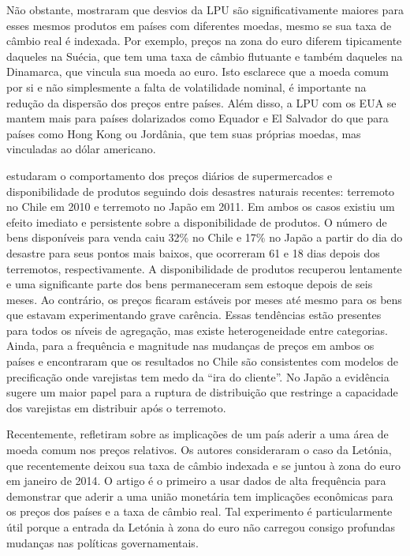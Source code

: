 \documentclass[twoside,a4paper,12pt]{report}
\begin{document}
Não obstante, \citet{cavallo2012currency} mostraram que desvios da LPU são significativamente maiores para esses mesmos produtos em países com diferentes moedas, mesmo se sua taxa de câmbio real é indexada. Por exemplo, preços na zona do euro diferem tipicamente daqueles na Suécia, que tem uma taxa de câmbio flutuante e também daqueles na Dinamarca, que vincula sua moeda ao euro. Isto esclarece que a moeda comum por si e não simplesmente a falta de volatilidade nominal, é importante na redução da dispersão dos preços entre países. Além disso, a LPU com os EUA se mantem mais para países dolarizados como Equador e El Salvador do que para países como Hong Kong ou Jordânia, que tem suas próprias moedas, mas vinculadas ao dólar americano. 

\citet{cavallo2013prices}	estudaram o comportamento dos preços diários de supermercados e disponibilidade de produtos seguindo dois desastres naturais recentes: terremoto no Chile em 2010 e terremoto no Japão em 2011. Em ambos os casos existiu um efeito imediato e persistente sobre a disponibilidade de produtos. O número de bens disponíveis para venda caiu 32\% no Chile e 17\% no Japão a partir do dia do desastre para seus pontos mais baixos, que ocorreram 61 e 18 dias depois dos terremotos, respectivamente. A disponibilidade de produtos recuperou lentamente e uma significante parte dos bens permaneceram sem estoque depois de seis meses. Ao contrário, os preços ficaram estáveis por meses até mesmo para os bens que estavam experimentando grave carência. Essas tendências estão presentes para todos os níveis de agregação, mas existe heterogeneidade entre categorias. Ainda, \citet{cavallo2013prices} para a frequência e magnitude nas mudanças de preços em ambos os países e encontraram que os resultados no Chile são consistentes com modelos de precificação onde varejistas tem medo da “ira do cliente”. No Japão a evidência sugere um maior papel para a ruptura de distribuição que restringe a capacidade dos varejistas em distribuir após o terremoto. 

Recentemente, \citet{cavallo2014price} refletiram sobre as implicações de um país aderir a uma área de moeda comum nos preços relativos. Os autores consideraram o caso da Letónia, que recentemente deixou sua taxa de câmbio indexada e se juntou à zona do euro em janeiro de 2014. O artigo é o primeiro a usar dados de alta frequência para demonstrar que aderir a uma união monetária tem implicações econômicas para os preços dos países e a taxa de câmbio real. Tal experimento é particularmente útil porque a entrada da Letónia à zona do euro não carregou consigo profundas mudanças nas políticas governamentais. 
\end{document}
